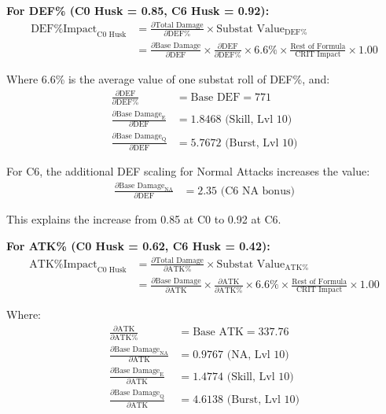 \documentclass[12pt,a4paper]{article}
\begin{document}
\textbf{For DEF\% (C0 Husk = 0.85, C6 Husk = 0.92):}
\begin{align}
\text{DEF\% Impact}_{\text{C0 Husk}} &= \frac{\partial \text{Total Damage}}{\partial \text{DEF\%}} \times \text{Substat Value}_{\text{DEF\%}} \\
&= \frac{\partial \text{Base Damage}}{\partial \text{DEF}} \times \frac{\partial \text{DEF}}{\partial \text{DEF\%}} \times 6.6\% \times \frac{\text{Rest of Formula}}{\text{CRIT Impact}} \times 1.00
\end{align}

Where 6.6\% is the average value of one substat roll of DEF\%, and:
\begin{align}
\frac{\partial \text{DEF}}{\partial \text{DEF\%}} &= \text{Base DEF} = 771 \\
\frac{\partial \text{Base Damage}_{\text{E}}}{\partial \text{DEF}} &= 1.8468 \text{ (Skill, Lvl 10)} \\
\frac{\partial \text{Base Damage}_{\text{Q}}}{\partial \text{DEF}} &= 5.7672 \text{ (Burst, Lvl 10)}
\end{align}

For C6, the additional DEF scaling for Normal Attacks increases the value:
\begin{align}
\frac{\partial \text{Base Damage}_{\text{NA}}}{\partial \text{DEF}} &= 2.35 \text{ (C6 NA bonus)}
\end{align}

This explains the increase from 0.85 at C0 to 0.92 at C6.

\textbf{For ATK\% (C0 Husk = 0.62, C6 Husk = 0.42):}
\begin{align}
\text{ATK\% Impact}_{\text{C0 Husk}} &= \frac{\partial \text{Total Damage}}{\partial \text{ATK\%}} \times \text{Substat Value}_{\text{ATK\%}} \\
&= \frac{\partial \text{Base Damage}}{\partial \text{ATK}} \times \frac{\partial \text{ATK}}{\partial \text{ATK\%}} \times 6.6\% \times \frac{\text{Rest of Formula}}{\text{CRIT Impact}} \times 1.00
\end{align}

Where:
\begin{align}
\frac{\partial \text{ATK}}{\partial \text{ATK\%}} &= \text{Base ATK} = 337.76 \\
\frac{\partial \text{Base Damage}_{\text{NA}}}{\partial \text{ATK}} &= 0.9767 \text{ (NA, Lvl 10)} \\
\frac{\partial \text{Base Damage}_{\text{E}}}{\partial \text{ATK}} &= 1.4774 \text{ (Skill, Lvl 10)} \\
\frac{\partial \text{Base Damage}_{\text{Q}}}{\partial \text{ATK}} &= 4.6138 \text{ (Burst, Lvl 10)}
\end{align}
\end{document}
